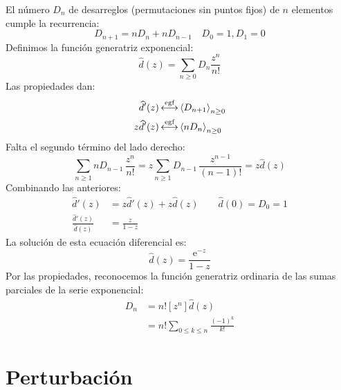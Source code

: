   El número \(D_n\) de desarreglos
  (permutaciones sin puntos fijos)
  de \(n\) elementos cumple la recurrencia:
  \begin{equation*}
    D_{n + 1}
      = n D_n + n D_{n - 1}
      \quad D_0 = 1, D_1 = 0
  \end{equation*}
  Definimos la función generatriz exponencial:
  \begin{equation*}
    \widehat{d}(z)
      = \sum_{n \ge 0} D_n \frac{z^n}{n!}
  \end{equation*}
  Las propiedades dan:
  \begin{align*}
    \widehat{d}'(z)
      &\operatorname{\stackrel{\text{egf}}{\longleftrightarrow}} \left\langle D_{n + 1} \right\rangle_{n \ge 0} \\
    z \widehat{d}'(z)
      &\operatorname{\stackrel{\text{egf}}{\longleftrightarrow}} \left\langle n D_n \right\rangle_{n \ge 0}
  \end{align*}
  Falta el segundo término del lado derecho:
  \begin{equation*}
    \sum_{n \ge 1} n D_{n - 1} \, \frac{z^n}{n!}
      = z \sum_{n \ge 1} D_{n - 1} \, \frac{z^{n - 1}}{(n - 1)!}
      = z \widehat{d}(z)
  \end{equation*}
    Combinando las anteriores:
  \begin{align*}
    \widehat{d}'(z)
      &= z \widehat{d}'(z) + z \widehat{d}(z)
           \qquad \widehat{d}(0) = D_0 = 1 \\
    \frac{\widehat{d}'(z)}{\widehat{d}(z)}
      &= \frac{z}{1 - z}
  \end{align*}
  La solución de esta ecuación diferencial es:
  \begin{equation*}
    \widehat{d}(z)
      = \frac{\mathrm{e}^{-z}}{1 - z}
  \end{equation*}
  Por las propiedades,
  reconocemos la función generatriz ordinaria
  de las sumas parciales de la serie exponencial:
  \begin{align*}
    D_n
      &= n! [z^n] \widehat{d}(z) \\
      &= n! \sum_{0 \le k \le n} \frac{(-1)^k}{k!}
  \end{align*}

\section{Perturbación}
\label{sec:perturbacion}

